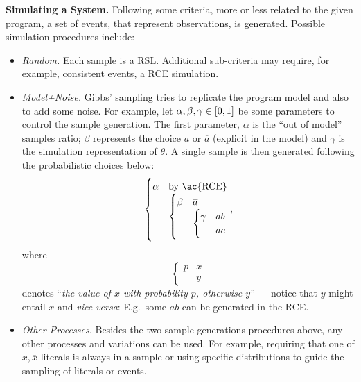 \documentclass{llncs}
\newcommand{\co}[1]{\ensuremath{\overline{#1}}}
\begin{document}
\bigskip\noindent\textbf{Simulating a System.} Following some criteria, more or less related to the given program, a set of events, that represent observations, is generated. Possible simulation procedures include:
\begin{itemize}
    \item \emph{Random.} Each sample is a \ac{RSL}. Additional sub-criteria may require, for example, consistent events, a \ac{RCE} simulation.
    \item \emph{Model+Noise.} Gibbs' sampling \cite{geman84} tries to replicate the program model and also to add some noise. For example, let $\alpha, \beta, \gamma \in \intcc{0,1}$ be some parameters to control the sample generation. The first parameter, $\alpha$ is the ``out of model'' samples ratio; $\beta$ represents the choice $a$ or $\co{a}$ (explicit in the model) and $\gamma$ is the simulation representation of $\theta$. A single sample is then generated following the probabilistic choices below:
          $$
              \begin{cases}
                  \alpha & \text{by \ac{RCE}} \\%
                         &
                  \begin{cases}
                      \beta & \co{a} \\%
                            &
                      \begin{cases}
                          \gamma & ab \\%
                                 & ac
                      \end{cases}
                  \end{cases}
              \end{cases},
          $$
          where
          $$
              \begin{cases}
                  p & x \\%
                    & y
              \end{cases}
          $$
          denotes ``\emph{the value of $x$ with probability $p$, otherwise $y$}'' --- notice that $y$ might entail $x$ and \emph{vice-versa}: E.g.\ some $ab$ can be generated in the \ac{RCE}.
    \item \emph{Other Processes.} Besides the two sample generations procedures above, any other processes and variations can be used. For example, requiring that one of $x, \co{x}$ literals is always in a sample or using specific distributions to guide the sampling of literals or events.
\end{itemize}
\end{document}
